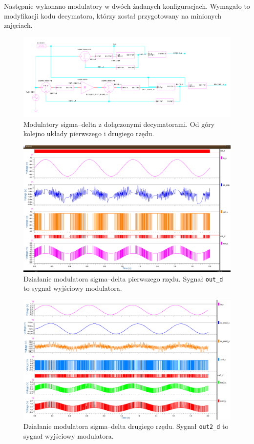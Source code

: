 \documentclass[13pt, a4paper, twoside]{mwart}
\begin{document}
Następnie wykonano modulatory w dwóch żądanych konfiguracjach. Wymagało to modyfikacji kodu decymatora, którzy został przygotowany na minionych zajęciach.

\begin{figure}[H]
	\centering
  \includegraphics[width=0.9\linewidth]{inv/sigma_delta_2_sch.png}
  \caption{Modulatory sigma--delta z dołączonymi decymatorami. Od góry kolejno układy pierwszego i drugiego rzędu.}
\end{figure}



\begin{figure}[H]
	\centering
  \includegraphics[width=\linewidth]{inv/sigma_delta.png}
  \caption{Działanie modulatora sigma--delta pierwszego rzędu. Sygnał \texttt{out\_d} to sygnał wyjściowy modulatora.}
\end{figure}

\begin{figure}[H]
	\centering
  \includegraphics[width=\linewidth]{inv/sigma_delta_2.png}
  \caption{Działanie modulatora sigma--delta drugiego rzędu. Sygnał \texttt{out2\_d} to sygnał wyjściowy modulatora.}
\end{figure}
\end{document}
